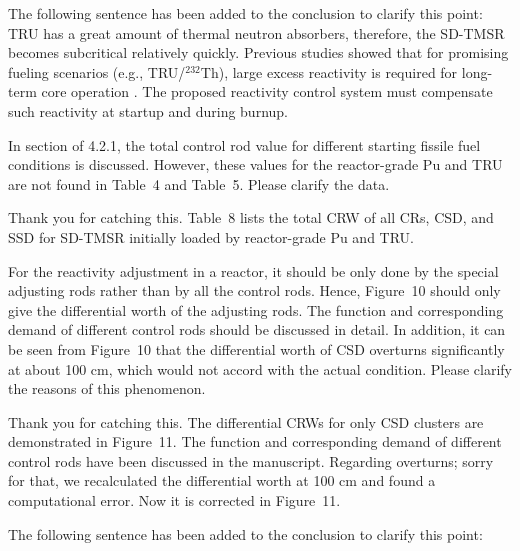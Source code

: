 \documentclass[answers,11pt]{exam}
\begin{document}
\begin{questions}
\begin{solution}
	The following sentence has been added to the conclusion to clarify this point:\\
	
	TRU has a great amount of thermal neutron absorbers, therefore, the SD-TMSR becomes subcritical relatively quickly. Previous studies showed that for promising fueling scenarios (e.g., TRU/$^{232}$Th), large excess reactivity is required for long-term core operation \cite{ashraf2020Strategies,betzler2017assessment,rykhlevskii_fuel_2019}. The proposed reactivity control system must compensate such reactivity at startup and during burnup.
	
	
\end{solution}

\question In section of 4.2.1, the total control rod value for different starting fissile fuel conditions is discussed. However, these values for the reactor-grade Pu and TRU are not found in Table~4 and Table~5. Please clarify the data.
\begin{solution}
	
	Thank you for catching this. Table~8 lists the total CRW of all CRs, CSD, and SSD for SD-TMSR initially loaded by reactor-grade Pu and TRU. 
	
	
\end{solution}

\question For the reactivity adjustment in a reactor, it should be only done by the special adjusting rods rather than by all the control rods. Hence, Figure~10 should only give the differential worth of the adjusting rods. The function and corresponding demand of different control rods should be discussed in detail. In addition, it can be seen from Figure~10 that the differential worth of CSD overturns significantly at about 100 cm, which would not accord with the actual condition. Please clarify the reasons of this phenomenon.
\begin{solution}
	
	Thank you for catching this. The differential CRWs for only CSD clusters are demonstrated in Figure~11. The function and corresponding demand of different control rods have been discussed in the manuscript. Regarding overturns; sorry for that, we recalculated the differential worth at 100 cm and found a computational error. Now it is corrected in Figure~11. 	
	
	The following sentence has been added to the conclusion to clarify this point:\\
	

\end{solution}
\end{questions}
\end{document}
